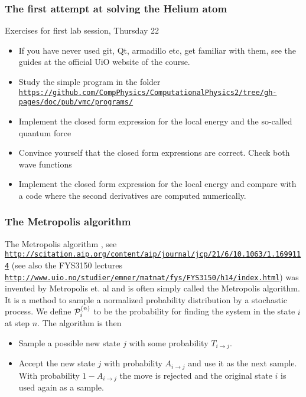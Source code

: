 \documentclass{beamer}
\begin{document}
\begin{frame}
\frametitle{The first attempt at solving the Helium atom}

\begin{block}{Exercises for first lab session, Thursday 22 }

\begin{itemize}
 \item If you have never used git, Qt, armadillo etc, get familiar with them, see the guides at the official UiO website of the course.

 \item Study the simple program in the folder \href{{https://github.com/CompPhysics/ComputationalPhysics2/tree/gh-pages/doc/pub/vmc/programs/}}{\nolinkurl{https://github.com/CompPhysics/ComputationalPhysics2/tree/gh-pages/doc/pub/vmc/programs/}}

 \item Implement the closed form expression for the local energy and the so-called quantum force

 \item Convince yourself that the closed form expressions are correct. Check both wave functions

 \item Implement the closed form expression for the local energy and compare with a code where the second derivatives are computed numerically.
\end{itemize}

\noindent
\end{block}
\end{frame}

\begin{frame}
\frametitle{The Metropolis algorithm}

\begin{block}{}
The Metropolis algorithm , see \href{{http://scitation.aip.org/content/aip/journal/jcp/21/6/10.1063/1.1699114}}{\nolinkurl{http://scitation.aip.org/content/aip/journal/jcp/21/6/10.1063/1.1699114}}  (see also the FYS3150 lectures \href{{http://www.uio.no/studier/emner/matnat/fys/FYS3150/h14/index.html}}{\nolinkurl{http://www.uio.no/studier/emner/matnat/fys/FYS3150/h14/index.html}})
was invented by Metropolis et. al
and is often simply called the Metropolis algorithm.
It is a method to sample a normalized probability
distribution by a stochastic process. We define ${\cal P}_i^{(n)}$ to
be the probability for finding the system in the state $i$ at step $n$.
The algorithm is then

\begin{itemize}
\item Sample a possible new state $j$ with some probability $T_{i\rightarrow j}$.

\item Accept the new state $j$ with probability $A_{i \rightarrow j}$ and use it as the next sample. With probability $1-A_{i\rightarrow j}$ the move is rejected and the original state $i$ is used again as a sample.
\end{itemize}

\noindent
\end{block}
\end{frame}
\end{document}
